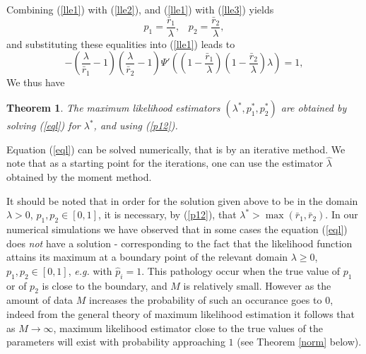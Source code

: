 \documentclass[a4paper,10pt,twoside]{article}
\newtheorem{theorem}{Theorem}
\begin{document}
Combining (\ref{lle1}) with (\ref{lle2}), and (\ref{lle1}) with (\ref{lle3}) yields
\begin{equation}\label{p12}p_1=\frac{\bar{r}_1}{\lambda},\;\;\;p_2=\frac{\bar{r}_2}{\lambda},\end{equation}
and substituting these equalities into (\ref{lle1}) leads to 
\begin{equation}\label{eql}-\left(\frac{\lambda}{\bar{r}_1}-1\right)\left(\frac{\lambda}{\bar{r}_2}-1\right) \Psi'\left(\left(1-\frac{\bar{r}_1}{\lambda}\right)\left(1-\frac{\bar{r}_2}{\lambda}\right)\lambda \right)= 1,\end{equation}
We thus have
\begin{theorem}
	The maximum likelihood estimators $(\lambda^*,p_1^*,p_2^*)$ are obtained by solving (\ref{eql}) for $\lambda^*$,
	and using (\ref{p12}).
	
\end{theorem}
Equation (\ref{eql}) can be solved numerically, that is by an iterative method. We note that as a starting point for the iterations,
one can use the estimator $\hat{\lambda}$ obtained by the moment method.

It should be noted that in order for the solution given above to be in the domain $\lambda>0$, $p_1,p_2\in [0,1]$, it is necessary, by
(\ref{p12}), that $\lambda^*>\max(\bar{r}_1,\bar{r}_2)$. In our numerical simulations we have observed that in some cases the equation (\ref{eql}) does {\it{not}} have a solution - corresponding to the fact that the likelihood function attains its maximum at a boundary point
of the relevant domain $\lambda\geq 0$, $p_1,p_2\in [0,1]$, {\it{e.g.}} with $\hat{p}_i=1$. This pathology occur when the true value of 
$p_1$ or of $p_2$ is close to the boundary, and $M$ is relatively small. However as the amount of data $M$ increases the probability of such an occurance goes to $0$, indeed from the general theory of maximum likelihood estimation it follows that as $M\rightarrow \infty$,
maximum likelihood estimator close to the true values of the parameters will exist with probability approaching $1$ (see Theorem 
\ref{norm} below). 
\end{document}

